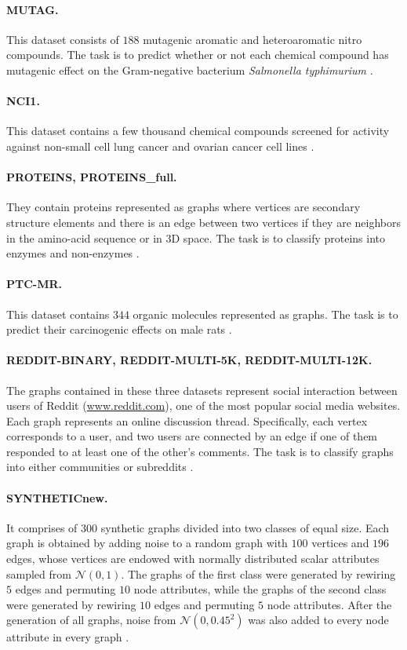 \documentclass[twoside,11pt]{article}
\begin{document}
\paragraph{MUTAG.} This dataset consists of $188$ mutagenic aromatic and heteroaromatic nitro compounds.
The task is to predict whether or not each chemical compound has mutagenic effect on the Gram-negative bacterium {\it Salmonella typhimurium} .
\paragraph{NCI1.} This dataset contains a few thousand chemical compounds screened for activity against non-small cell lung cancer and ovarian cancer cell lines .
\paragraph{PROTEINS, PROTEINS\_full.} They contain proteins represented as graphs where vertices are secondary structure elements and there is an edge between two vertices if they are neighbors in the amino-acid sequence or in $3$D space.
The task is to classify proteins into enzymes and non-enzymes . 
\paragraph{PTC-MR.} This dataset contains $344$ organic molecules represented as graphs.
The task is to predict their carcinogenic effects on male rats . 
\paragraph{REDDIT-BINARY, REDDIT-MULTI-5K, REDDIT-MULTI-12K.} The graphs contained in these three datasets represent social interaction between users of Reddit (\url{www.reddit.com}), one of the most popular social media websites.
Each graph represents an online discussion thread.
Specifically, each vertex corresponds to a user, and two users are connected by an edge if one of them responded to at least one of the other's comments.
The task is to classify graphs into either communities or subreddits .
\paragraph{SYNTHETICnew.} It comprises of $300$ synthetic graphs divided into two classes of equal size.
Each graph is obtained by adding noise to a random graph with $100$ vertices and $196$ edges, whose vertices are endowed with normally distributed scalar attributes sampled from $\mathcal{N}(0,1)$.
The graphs of the first class were generated by rewiring $5$ edges and permuting $10$ node attributes, while the graphs of the second class were generated by rewiring $10$ edges and permuting $5$ node attributes.
After the generation of all graphs, noise from $\mathcal{N}(0,0.45^2)$ was also added to every node attribute in every graph .
\end{document}
